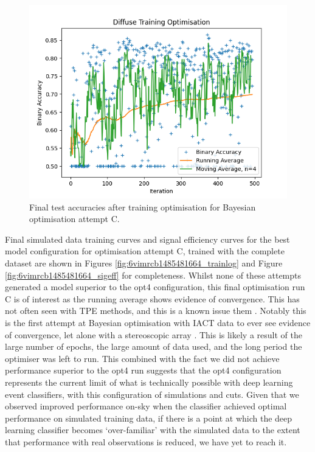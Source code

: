 \begin{figure}[h] 
        \centering \includegraphics[width=\columnwidth]{figures/convplot_longmoredata.png}

        \caption{
                \label{fig:convplot_longmoredata} Final test accuracies after training optimisation for Bayesian optimisation attempt C.
        }
\end{figure}

Final simulated data training curves and signal efficiency curves for the best model configuration for optimisation attempt C, trained with the complete dataset are shown in Figures \ref{fig:6vimrcb1485481664_trainlog} and Figure \ref{fig:6vimrcb1485481664_sigeff} for completeness. Whilst none of these attempts generated a model superior to the opt4 configuration, this final optimisation run C is of interest as the running average shows evidence of convergence. This has not often seen with TPE methods, and this is a known issue them \cite{autosklearn}. Notably this is the first attempt at Bayesian optimisation with IACT data to ever see evidence of convergence, let alone with a stereoscopic array \cite{nietopc}. This is likely a result of the large number of epochs, the large amount of data used, and the long period the optimiser was left to run. This combined with the fact we did not achieve performance superior to the opt4 run suggests that the opt4 configuration represents the current limit of what is technically possible with deep learning event classifiers, with this configuration of simulations and cuts. Given that we observed improved performance on-sky when the classifier achieved optimal performance on simulated training data, if there is a point at which the deep learning classifier becomes `over-familiar' with the simulated data to the extent that performance with real observations is reduced, we have yet to reach it.


